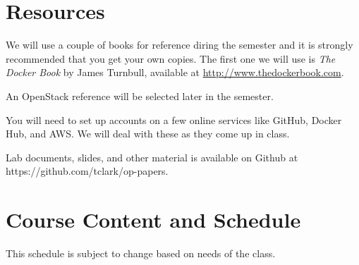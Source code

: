 \documentclass{article}
\begin{document}
\section*{Resources}
We will use a couple of books for reference diring the semester and it is strongly recommended that you get your own copies.  The first one we will use is \emph{The Docker Book} by James Turnbull, available at \url{http://www.thedockerbook.com}.

An OpenStack reference will be selected later in the semester.

You will need to set up accounts on a few online services like GitHub, Docker Hub, and AWS.  We will deal with these as they come up in class.

Lab documents, slides, and other material is available on Github at https://github.com/tclark/op-papers.

\newpage 

\section*{Course Content and Schedule}
This schedule is subject to change based on needs of the class.
\end{document}
